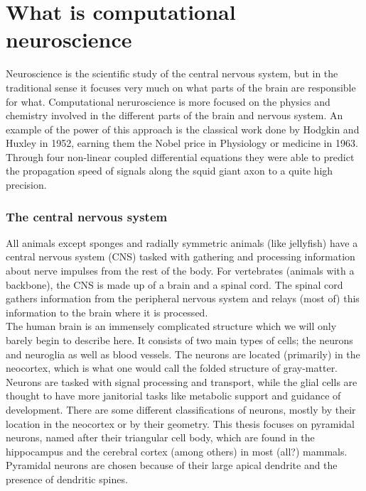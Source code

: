 \documentclass[main.tex]{subfiles}
\begin{document}
\section{What is computational neuroscience}
Neuroscience is the scientific study of the central nervous system, but in the traditional sense it focuses very much on what parts of the brain are responsible for what. 
Computational neruroscience is more focused on the physics and chemistry involved in the different parts of the brain and nervous system. 
An example of the power of this approach is the classical work done by Hodgkin and Huxley in 1952, earning them the Nobel price in Physiology or medicine in 1963. 
Through four non-linear coupled differential equations they were able to predict the propagation speed of signals along the squid giant axon to a quite high precision. \\


\subsubsection{The central nervous system}
All animals except sponges and radially symmetric animals (like jellyfish) have a central nervous system (CNS) tasked with gathering and processing information about nerve impulses from the rest of the body. 
For vertebrates (animals with a backbone), the CNS is made up of a brain and a spinal cord. 
The spinal cord gathers information from the peripheral nervous system and relays (most of) this information to the brain where it is processed.\\

The human brain is an immensely complicated structure which we will only barely begin to describe here. 
It consists of two main types of cells; the neurons and neuroglia as well as blood vessels. 
The neurons are located (primarily) in the neocortex, which is what one would call the folded structure of gray-matter. 
Neurons are tasked with signal processing and transport, while the glial cells are thought to have more janitorial tasks like metabolic support and guidance of development. 
There are some different classifications of neurons, mostly by their location in the neocortex or by their geometry. 
This thesis focuses on pyramidal neurons, named after their triangular cell body, which are found in the hippocampus and the cerebral cortex (among others) in most (all?) mammals. 
Pyramidal neurons are chosen because of their large apical dendrite and the presence of dendritic spines. 
\end{document}
